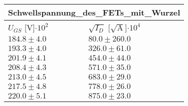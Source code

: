 \documentclass{article}
\begin{document}
\begin{tabular}{|p{3cm}|p{3cm}|}
\hline
\multicolumn{2}{|c|}{Schwellspannung_des_FETs_mit_Wurzel}\\
\hline
$U_{GS}$ [V]$\cdot 10^{2}$&$\sqrt{I_D}$ [$\sqrt{\text{A}}$]$\cdot 10^{4}$\\
\hline
$184.8\pm4.0$&$80.0\pm 260.0$\\
$193.3\pm4.0$&$326.0\pm 61.0$\\
$201.9\pm4.1$&$454.0\pm 44.0$\\
$208.4\pm4.3$&$571.0\pm 35.0$\\
$213.0\pm4.5$&$683.0\pm 29.0$\\
$217.5\pm4.8$&$778.0\pm 26.0$\\
$220.0\pm5.1$&$875.0\pm 23.0$\\
\hline
\end{tabular}
\end{document}
